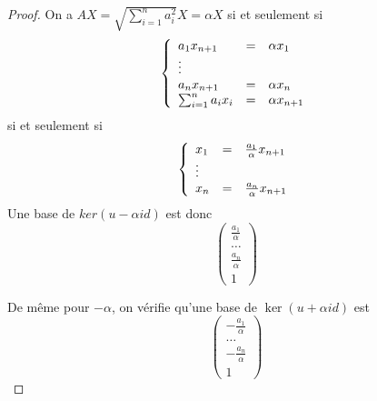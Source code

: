 \documentclass[12pt]{article}
\begin{document}
\begin{proof}
	On a $AX=\sqrt{\sum_{i=1}^{n}a_{i}^{2}}X=\alpha X$ si et seulement si 
	\begin{equation}
		\left\lbrace
			\begin{array}[]{lll}
				a_{1}x_{n+1}&=&\alpha x_{1}\\
				\vdots\\
				a_{n}x_{n+1}&=&\alpha x_{n}\\
				\sum_{i=1}^{n}a_{i}x_{i}&=&\alpha x_{n+1}
			\end{array}
		\right.
	\end{equation}
	si et seulement si
	\begin{equation}
		\left\lbrace
			\begin{array}[]{lll}
				x_{1}&=&\frac{a_{1}}{\alpha}x_{n+1}\\
				\vdots\\
				x_{n}&=&\frac{a_{n}}{\alpha}x_{n+1}\\
			\end{array}
		\right.
	\end{equation}
	Une base de $ker(u-\alpha id)$ est donc 
	\begin{equation}
		\begin{pmatrix}
			\frac{a_{1}}{\alpha}\\
			\dots\\
			\frac{a_{n}}{\alpha}\\
			1
		\end{pmatrix}
	\end{equation}

	De même pour $-\alpha$, on vérifie qu'une base de $\ker(u+\alpha id)$ est 
	\begin{equation}
		\begin{pmatrix}
			-\frac{a_{1}}{\alpha}\\
			\dots\\
			-\frac{a_{n}}{\alpha}\\
			1
		\end{pmatrix}
	\end{equation}
\end{proof}
\end{document}
